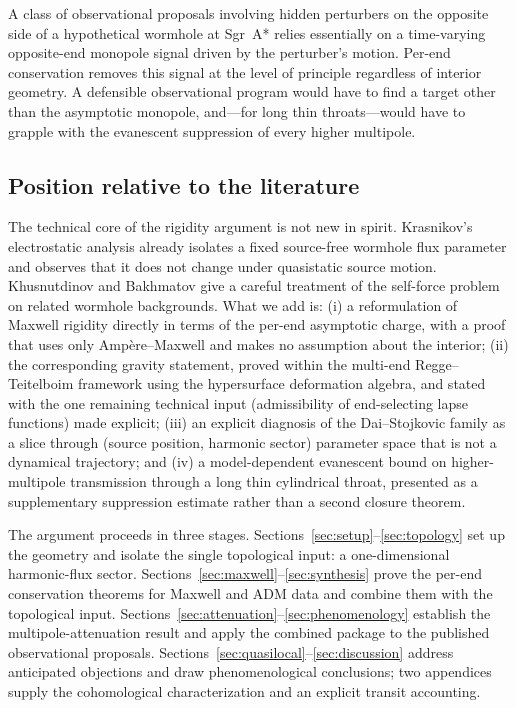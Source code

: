 \documentclass[aps,prd,onecolumn,nofootinbib,superscriptaddress]{revtex4-2}
\begin{document}
A class of observational proposals involving hidden perturbers on the opposite side of a hypothetical wormhole at Sgr~A* relies essentially on a time-varying opposite-end monopole signal driven by the perturber's motion.\cite{DaiStojkovic2019Observing,SimonettiEtAl2021SensitiveSearches} Per-end conservation removes this signal at the level of principle regardless of interior geometry. A defensible observational program would have to find a target other than the asymptotic monopole, and---for long thin throats---would have to grapple with the evanescent suppression of every higher multipole.

\subsection*{Position relative to the literature}

The technical core of the rigidity argument is not new in spirit. Krasnikov's electrostatic analysis already isolates a fixed source-free wormhole flux parameter and observes that it does not change under quasistatic source motion.\cite{Krasnikov2008ElectrostaticInteraction,Krasnikov2020CommentObserving} Khusnutdinov and Bakhmatov give a careful treatment of the self-force problem on related wormhole backgrounds.\cite{KhusnutdinovBakhmatov2007SelfForce} What we add is: (i) a reformulation of Maxwell rigidity directly in terms of the per-end asymptotic charge, with a proof that uses only Amp\`ere--Maxwell and makes no assumption about the interior; (ii) the corresponding gravity statement, proved within the multi-end Regge--Teitelboim framework using the hypersurface deformation algebra, and stated with the one remaining technical input (admissibility of end-selecting lapse functions) made explicit; (iii) an explicit diagnosis of the Dai--Stojkovic family as a slice through (source position, harmonic sector) parameter space that is not a dynamical trajectory; and (iv) a model-dependent evanescent bound on higher-multipole transmission through a long thin cylindrical throat, presented as a supplementary suppression estimate rather than a second closure theorem.

The argument proceeds in three stages. Sections~\ref{sec:setup}--\ref{sec:topology} set up the geometry and isolate the single topological input: a one-dimensional harmonic-flux sector. Sections~\ref{sec:maxwell}--\ref{sec:synthesis} prove the per-end conservation theorems for Maxwell and ADM data and combine them with the topological input. Sections~\ref{sec:attenuation}--\ref{sec:phenomenology} establish the multipole-attenuation result and apply the combined package to the published observational proposals. Sections~\ref{sec:quasilocal}--\ref{sec:discussion} address anticipated objections and draw phenomenological conclusions; two appendices supply the cohomological characterization and an explicit transit accounting.
\end{document}
